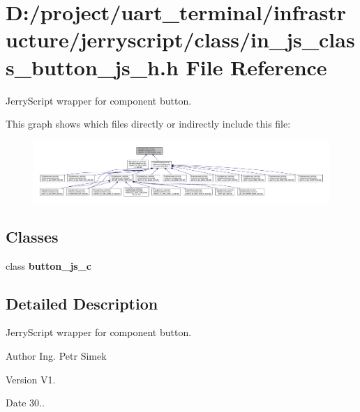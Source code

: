 \section{D\+:/project/uart\+\_\+terminal/infrastructure/jerryscript/class/in\+\_\+js\+\_\+class\+\_\+button\+\_\+js\+\_\+h.h File Reference}
\label{in__js__class__button__js__h_8h}


Jerry\+Script wrapper for component button.  


This graph shows which files directly or indirectly include this file\+:
\nopagebreak
\begin{figure}[H]
\begin{center}
\leavevmode
\includegraphics[width=350pt]{in__js__class__button__js__h_8h__dep__incl}
\end{center}
\end{figure}
\subsection*{Classes}
\begin{DoxyCompactItemize}
\item 
class \textbf{ button\+\_\+js\+\_\+c}
\end{DoxyCompactItemize}


\subsection{Detailed Description}
Jerry\+Script wrapper for component button. 

\begin{DoxyAuthor}{Author}
Ing. Petr Simek 
\end{DoxyAuthor}
\begin{DoxyVersion}{Version}
V1. 
\end{DoxyVersion}
\begin{DoxyDate}{Date}
30.. 
\end{DoxyDate}
